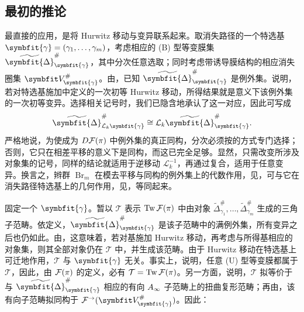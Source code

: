 \subsection{最初的推论}\label{sec:18j}
最直接的应用，是将 Hurwitz 移动与变异联系起来。取消失路径的一个特选基
$\symbfit{\gamma}=(\gamma_1,\ldots,\gamma_m)$，考虑相应的 (B) 型等变膜集 $\widetilde{\symbfit{\Delta}}_{\symbfit{\gamma}}^\#$，其中分次任意选取；同时考虑带诱导膜结构的相应消失圈集 $\symbfit V_{\symbfit{\gamma}}^\#$。由，已知 $\widetilde{\symbfit{\Delta}}_{\symbfit{\gamma}}^\#$ 是例外集。说明，若对特选基施加中定义的一次初等 Hurwitz 移动，所得结果就是意义下该例外集的一次初等变异。选择相关记号时，我们已隐含地承认了这一对应，因此可写成
\begin{equation}\label{eq:18.29}
\widetilde{\symbfit{\Delta}}_{\mathcal L_k\symbfit{\gamma}}^\#
\cong\mathcal L_k\widetilde{\symbfit{\Delta}}_{\symbfit{\gamma}}^\#.
\end{equation}
严格地说，为使成为 $D\mathcal F(\pi)$ 中例外集的真正同构，分次必须按的方式专门选择；否则，它只在相差平移的意义下是同构，而这已完全足够。显然，只需改变所涉及对象集的记号，同样的结论就适用于逆移动 $\mathcal L_k^{-1}$，再通过复合，适用于任意变异。换言之，辫群 $\operatorname{Br}_m$ 在模去平移与同构的例外集上的代数作用，见，可与它在消失路径特选基上的几何作用，见，等同起来。

固定一个 $\symbfit{\gamma}$。暂以 $\mathcal T$ 表示 $\operatorname{Tw}\mathcal F(\pi)$ 中由对象 $\widetilde\Delta_{\gamma_1}^\#,\ldots,\widetilde\Delta_{\gamma_m}^\#$ 生成的三角子范畴。依定义，$\widetilde{\symbfit{\Delta}}_{\symbfit{\gamma}}^\#$ 是该子范畴中的满例外集，所有变异之后也仍如此。由，这意味着，若对基施加 Hurwitz 移动，再考虑与所得基相应的对象集，则其全部对象仍在 $\mathcal T$ 中，并生成该范畴。由于 Hurwitz 移动在特选基上可迁地作用，$\mathcal T$ 与 $\symbfit{\gamma}$ 无关。事实上，说明，任意 (U) 型等变膜都属于 $\mathcal T$，因此，由 $\mathcal F(\pi)$ 的定义，必有 $\mathcal T=\operatorname{Tw}\mathcal F(\pi)$。另一方面，说明，$\mathcal T$ 拟等价于与 $\widetilde{\symbfit{\Delta}}_{\symbfit{\gamma}}^\#$ 相应的有向 $A_\infty$ 子范畴上的扭曲复形范畴；再由，该有向子范畴拟同构于 $\F^\to(\symbfit V_{\symbfit{\gamma}}^\#)$。因此：

